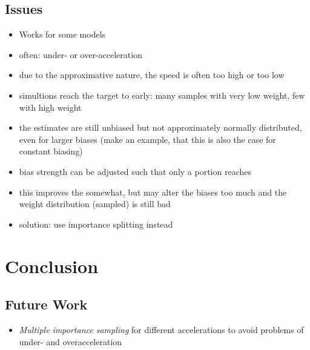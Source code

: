 \subsection{Issues}
\begin{itemize}
    \item Works for some models
    \item often: under- or over-acceleration
    \item due to the approximative nature, the speed is often too high or too low
    \item simultions reach the target to early: many samples with very low weight, few with high weight
    \item the estimates are still unbiased but not approximately normally distributed, even for larger biases (make an example, that this is also the case for constant biasing)
    \item bias strength can be adjusted such that only a portion reaches
    \item this improves the somewhat, but may alter the biases too much and the weight distribution (sampled) is still bad
    \item solution: use importance splitting instead
\end{itemize}



\section{Conclusion}
\subsection{Future Work}
\begin{itemize}
    \item \emph{Multiple importance sampling} for different accelerations to avoid problems of under- and overacceleration
\end{itemize}
